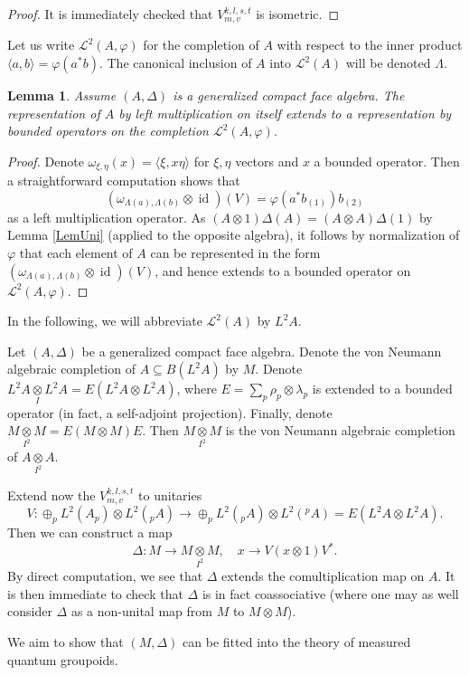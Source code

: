 \documentclass[12pt]{article}
\theoremstyle{change}
\DeclareMathOperator{\id}{id}
\newcommand{\iitimes}{\underset{I}{\otimes}}
\newcommand{\itimes}{\underset{I^2}{\otimes}}
\newtheorem{Lem}[Theorem]{Lemma}
\theoremstyle{definition}
\numberwithin{equation}{section}
\begin{document}
\begin{proof} It is immediately checked that $V^{k,l,s,t}_{m,v}$ is isometric.
\end{proof}

Let us write $\mathscr{L}^2(A,\varphi)$ for the completion of $A$ with respect to the inner product $\langle a,b\rangle = \varphi(a^*b)$. The canonical inclusion of $A$ into $\mathscr{L}^2(A)$ will be denoted $\Lambda$.

\begin{Lem} Assume $(A,\Delta)$ is a generalized compact face algebra. The representation of $A$ by left multiplication on itself extends to a representation by bounded operators on the completion $\mathscr{L}^2(A,\varphi)$.
\end{Lem}

\begin{proof} Denote $\omega_{\xi,\eta}(x) = \langle \xi,x\eta\rangle$ for $\xi,\eta$ vectors and $x$ a bounded operator. Then a straightforward computation shows that \[(\omega_{\Lambda(a),\Lambda(b)}\otimes \id)(V) = \varphi(a^*b_{(1)})b_{(2)}\] as a left multiplication operator. As $(A\otimes 1)\Delta(A) = (A\otimes A)\Delta(1)$ by Lemma \ref{LemUni} (applied to the opposite algebra), it follows by normalization of $\varphi$ that each element of $A$ can be represented in the form $(\omega_{\Lambda(a),\Lambda(b)}\otimes \id)(V)$, and hence extends to a bounded operator on $\mathscr{L}^2(A,\varphi)$.
\end{proof}

In the following, we will abbreviate $\mathscr{L}^2(A)$ by $L^2A$.

Let $(A,\Delta)$ be a generalized compact face algebra. Denote the von Neumann algebraic completion of $A\subseteq B(L^2A)$ by $M$. Denote $L^2A\iitimes L^2A = E(L^2A\otimes L^2A)$, where $E = \sum_p \rho_p\otimes \lambda_p$ is extended to a bounded operator (in fact, a self-adjoint projection). Finally, denote $M\itimes M = E(M\otimes M)E$. Then $M\itimes M$ is the von Neumann algebraic completion of $A\itimes A$.

Extend now the $V^{k,l,s,t}_{m,v}$ to unitaries \[V: \oplus_p L^2(A_p)\otimes L^2({}_pA) \rightarrow \oplus_p L^2({}_pA)\otimes L^2({}^pA)= E(L^2A\otimes L^2A).\] Then we can construct a map \[\Delta: M\rightarrow M\itimes M,\quad x\rightarrow V(x\otimes 1)V^*.\] By direct computation, we see that $\Delta$ extends the comultiplication map on $A$. It is then immediate to check that $\Delta$ is in fact coassociative (where one may as well consider $\Delta$ as a non-unital map from $M$ to $M\otimes M$).

We aim to show that $(M,\Delta)$ can be fitted into the theory of measured quantum groupoids.
\end{document}
